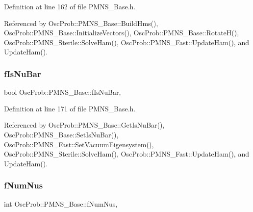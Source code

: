 Definition at line 162 of file P\+M\+N\+S\+\_\+\+Base.\+h.



Referenced by Osc\+Prob\+::\+P\+M\+N\+S\+\_\+\+Base\+::\+Build\+Hms(), Osc\+Prob\+::\+P\+M\+N\+S\+\_\+\+Base\+::\+Initialize\+Vectors(), Osc\+Prob\+::\+P\+M\+N\+S\+\_\+\+Base\+::\+Rotate\+H(), Osc\+Prob\+::\+P\+M\+N\+S\+\_\+\+Sterile\+::\+Solve\+Ham(), Osc\+Prob\+::\+P\+M\+N\+S\+\_\+\+Fast\+::\+Update\+Ham(), and Update\+Ham().

\mbox{\label{classOscProb_1_1PMNS__Base_a0ebaeaefab36a3ff381c6293faedfdd6}} 
\subsubsection{\texorpdfstring{f\+Is\+Nu\+Bar}{fIsNuBar}}
{\footnotesize\ttfamily bool Osc\+Prob\+::\+P\+M\+N\+S\+\_\+\+Base\+::f\+Is\+Nu\+Bar\hspace{0.3cm}{\ttfamily [protected]}, {\ttfamily [inherited]}}



Definition at line 171 of file P\+M\+N\+S\+\_\+\+Base.\+h.



Referenced by Osc\+Prob\+::\+P\+M\+N\+S\+\_\+\+Base\+::\+Get\+Is\+Nu\+Bar(), Osc\+Prob\+::\+P\+M\+N\+S\+\_\+\+Base\+::\+Set\+Is\+Nu\+Bar(), Osc\+Prob\+::\+P\+M\+N\+S\+\_\+\+Fast\+::\+Set\+Vacuum\+Eigensystem(), Osc\+Prob\+::\+P\+M\+N\+S\+\_\+\+Sterile\+::\+Solve\+Ham(), Osc\+Prob\+::\+P\+M\+N\+S\+\_\+\+Fast\+::\+Update\+Ham(), and Update\+Ham().

\mbox{\label{classOscProb_1_1PMNS__Base_a24bb74bed63569dfe88b18fa6a08060e}} 
\subsubsection{\texorpdfstring{f\+Num\+Nus}{fNumNus}}
{\footnotesize\ttfamily int Osc\+Prob\+::\+P\+M\+N\+S\+\_\+\+Base\+::f\+Num\+Nus\hspace{0.3cm}{\ttfamily [protected]}, {\ttfamily [inherited]}}




